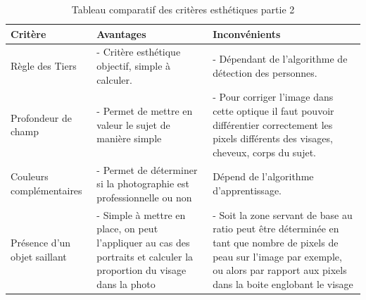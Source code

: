 \documentclass[11pt, french,screen]{report-rd-info}
\begin{document}
\begin{table}
\begin{center}
\begin{tabular}{|p{3cm}|p{6cm}|p{7cm}|}
\hline
\textbf{Critère} & \textbf{Avantages} & \textbf{Inconvénients} \\ \hline
Règle des Tiers & - Critère esthétique objectif, simple à calculer. & - Dépendant de l'algorithme de détection des personnes. \\ \hline
Profondeur de champ & - Permet de mettre en valeur le sujet de manière simple & - Pour corriger l'image dans cette optique il faut pouvoir différentier correctement les pixels différents des visages, cheveux, corps du sujet. \\ \hline
Couleurs complémentaires & - Permet de déterminer si la photographie est professionnelle ou non & Dépend de l’algorithme d'apprentissage. \\ \hline
Présence d'un objet saillant & - Simple à mettre en place, on peut l'appliquer au cas des portraits et calculer la proportion du visage dans la photo & - Soit la zone servant de base au ratio peut être déterminée en tant que nombre de pixels de peau sur l'image par exemple, ou alors par rapport aux pixels dans la boite englobant le visage \\ \hline
\end{tabular}
\end{center}
\caption{Tableau comparatif des critères esthétiques partie 2}
\label{tab:ComparaisonCriteres2}
\end{table}
\end{document}
